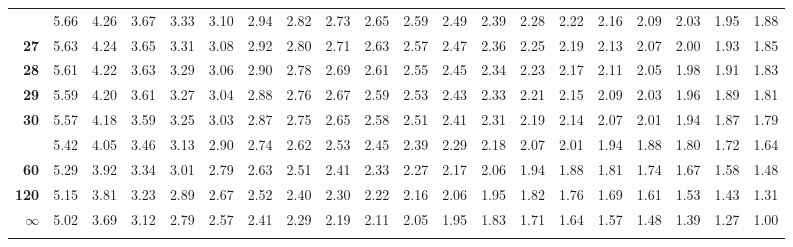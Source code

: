 \documentclass[]{article}
\begin{document}
\begin{landscape}
\begin{longtable}{>{\bfseries}r|rrrrrrrrrrrrrrrrrrr}
\addlinespace
26 & 5.66 & 4.26 & 3.67 & 3.33 & 3.10 & 2.94 & 2.82 & 2.73 & 2.65 & 2.59 & 2.49 & 2.39 & 2.28 & 2.22 & 2.16 & 2.09 & 2.03 & 1.95 & 1.88\\
27 & 5.63 & 4.24 & 3.65 & 3.31 & 3.08 & 2.92 & 2.80 & 2.71 & 2.63 & 2.57 & 2.47 & 2.36 & 2.25 & 2.19 & 2.13 & 2.07 & 2.00 & 1.93 & 1.85\\
28 & 5.61 & 4.22 & 3.63 & 3.29 & 3.06 & 2.90 & 2.78 & 2.69 & 2.61 & 2.55 & 2.45 & 2.34 & 2.23 & 2.17 & 2.11 & 2.05 & 1.98 & 1.91 & 1.83\\
29 & 5.59 & 4.20 & 3.61 & 3.27 & 3.04 & 2.88 & 2.76 & 2.67 & 2.59 & 2.53 & 2.43 & 2.33 & 2.21 & 2.15 & 2.09 & 2.03 & 1.96 & 1.89 & 1.81\\
30 & 5.57 & 4.18 & 3.59 & 3.25 & 3.03 & 2.87 & 2.75 & 2.65 & 2.58 & 2.51 & 2.41 & 2.31 & 2.19 & 2.14 & 2.07 & 2.01 & 1.94 & 1.87 & 1.79\\
\addlinespace
40 & 5.42 & 4.05 & 3.46 & 3.13 & 2.90 & 2.74 & 2.62 & 2.53 & 2.45 & 2.39 & 2.29 & 2.18 & 2.07 & 2.01 & 1.94 & 1.88 & 1.80 & 1.72 & 1.64\\
60 & 5.29 & 3.92 & 3.34 & 3.01 & 2.79 & 2.63 & 2.51 & 2.41 & 2.33 & 2.27 & 2.17 & 2.06 & 1.94 & 1.88 & 1.81 & 1.74 & 1.67 & 1.58 & 1.48\\
120 & 5.15 & 3.81 & 3.23 & 2.89 & 2.67 & 2.52 & 2.40 & 2.30 & 2.22 & 2.16 & 2.06 & 1.95 & 1.82 & 1.76 & 1.69 & 1.61 & 1.53 & 1.43 & 1.31\\
$\infty$ & 5.02 & 3.69 & 3.12 & 2.79 & 2.57 & 2.41 & 2.29 & 2.19 & 2.11 & 2.05 & 1.95 & 1.83 & 1.71 & 1.64 & 1.57 & 1.48 & 1.39 & 1.27 & 1.00\\*
\end{longtable}

\endgroup{}
\end{landscape}
\end{document}
